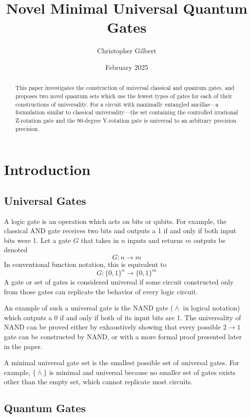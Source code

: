 \documentclass[12pt]{article}
\title{Novel Minimal Universal Quantum Gates}
\author{Christopher Gilbert}
\date{February 2025}
\newcommand{\nand}{\overline{\land}}
\begin{document}
\maketitle
\newpage

\begin{abstract}
This paper investigates the construction of universal classical and quantum gates, and proposes two novel quantum sets which use the fewest types of gates for each of their constructions of universality. For a circuit with  maximally entangled ancillas---a formulation similar to classical universality---the set containing the controlled irrational Z-rotation gate and the 90-degree Y-rotation gate is universal to an arbitrary precision precision.
\end{abstract}
\newpage

\section{Introduction}

\subsection{Universal Gates}
A logic gate is an operation which acts on bits or qubits. For example, the classical AND gate receives two bits and outputs a 1 if and only if both input bits were 1. Let a gate $G$ that takes in $n$ inputs and returns $m$ outputs be denoted
$$G : n \to m$$
In conventional function notation, this is equivalent to
$$G : \{0, 1\}^n \to \{0, 1\}^m$$
A gate or set of gates is considered universal if some circuit constructed only from those gates can replicate the behavior of every logic circuit.

An example of such a universal gate is the NAND gate ($\nand$ in logical notation) which outputs a 0 if and only if both of its input bits are 1. The universality of NAND can be proved either by exhaustively showing that every possible $2 \to 1$ gate can be constructed by NAND, or with a more formal proof presented later in the paper.

A minimal universal gate set is the smallest possible set of universal gates. For example, $\{ \nand \}$ is minimal and universal because no smaller set of gates exists other than the empty set, which cannot replicate most circuits.

\subsection{Quantum Gates}
\end{document}

